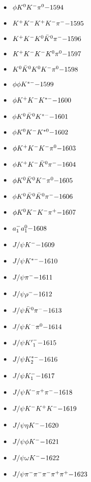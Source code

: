 \begin{multicols}{3}
\begin{itemize}
 \item $ \phi K^{0} K^{-} \pi^{0} \hfill{-1594}$
 \item $ K^{+} K^{-} K^{+} K^{-} \pi^{-} \hfill{-1595}$
 \item $ K^{+} K^{-} K^{0} \bar{K}^{0} \pi^{-} \hfill{-1596}$
 \item $ K^{+} K^{-} K^{-} K^{0} \pi^{0} \hfill{-1597}$
 \item $ K^{0} \bar{K}^{0} K^{0} K^{-} \pi^{0} \hfill{-1598}$
 \item $ \phi \phi K^{*-} \hfill{-1599}$
 \item $ \phi K^{+} K^{-} K^{*-} \hfill{-1600}$
 \item $ \phi K^{0} \bar{K}^{0} K^{*-} \hfill{-1601}$
 \item $ \phi K^{0} K^{-} K^{*0} \hfill{-1602}$
 \item $ \phi K^{+} K^{-} K^{-} \pi^{0} \hfill{-1603}$
 \item $ \phi K^{+} K^{-} \bar{K}^{0} \pi^{-} \hfill{-1604}$
 \item $ \phi K^{0} \bar{K}^{0} K^{-} \pi^{0} \hfill{-1605}$
 \item $ \phi K^{0} \bar{K}^{0} \bar{K}^{0} \pi^{-} \hfill{-1606}$
 \item $ \phi K^{0} K^{-} K^{-} \pi^{+} \hfill{-1607}$
 \item $ a_{1}^{-} a_{1}^{0} \hfill{-1608}$
 \item $ J/\psi K^{-} \hfill{-1609}$
 \item $ J/\psi K^{*-} \hfill{-1610}$
 \item $ J/\psi \pi^{-} \hfill{-1611}$
 \item $ J/\psi \rho^{-} \hfill{-1612}$
 \item $ J/\psi \bar{K}^{0} \pi^{-} \hfill{-1613}$
 \item $ J/\psi K^{-} \pi^{0} \hfill{-1614}$
 \item $ J/\psi {K^{\prime}}_{1}^{-} \hfill{-1615}$
 \item $ J/\psi K_{2}^{*-} \hfill{-1616}$
 \item $ J/\psi K_{1}^{-} \hfill{-1617}$
 \item $ J/\psi K^{-} \pi^{+} \pi^{-} \hfill{-1618}$
 \item $ J/\psi K^{-} K^{+} K^{-} \hfill{-1619}$
 \item $ J/\psi \eta K^{-} \hfill{-1620}$
 \item $ J/\psi \phi K^{-} \hfill{-1621}$
 \item $ J/\psi \omega K^{-} \hfill{-1622}$
 \item $ J/\psi \pi^{-} \pi^{-} \pi^{-} \pi^{+} \pi^{+} \hfill{-1623}$

\end{itemize}
\end{multicols}
